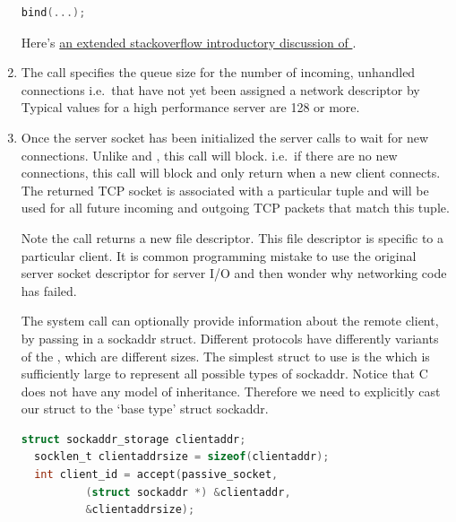 \begin{enumerate}
\begin{lstlisting}[language=C]
  bind(...);
  \end{lstlisting}

  Here's \href{http://stackoverflow.com/questions/14388706/socket-options-so-reuseaddr-and-so-reuseport-how-do-they-differ-do-they-mean-t}{an extended stackoverflow introductory discussion of }.


  \item {}

  The  call specifies the queue size for the number of incoming, unhandled connections i.e.~that have not yet been assigned a network descriptor by  Typical values for a high performance server are 128 or more.

  \item {}

  Once the server socket has been initialized the server calls  to wait for new connections.
  Unlike   and , this call will block.
  i.e.~if there are no new connections, this call will block and only return when a new client connects.
  The returned TCP socket is associated with a particular tuple  and will be used for all future incoming and outgoing TCP packets that match this tuple.

  Note the  call returns a new file descriptor.
  This file descriptor is specific to a particular client.
  It is common programming mistake to use the original server socket descriptor for server I/O and then wonder why networking code has failed.

  The  system call can optionally provide information about the remote client, by passing in a sockaddr struct.
  Different protocols have differently variants of the , which are different sizes.
  The simplest struct to use is the  which is sufficiently large to represent all possible types of sockaddr.
  Notice that C does not have any model of inheritance.
  Therefore we need to explicitly cast our struct to the `base type' struct sockaddr.

  \begin{lstlisting}[language=C]
  struct sockaddr_storage clientaddr;
  socklen_t clientaddrsize = sizeof(clientaddr);
  int client_id = accept(passive_socket,
          (struct sockaddr *) &clientaddr,
          &clientaddrsize);
  \end{lstlisting}


\end{enumerate}
